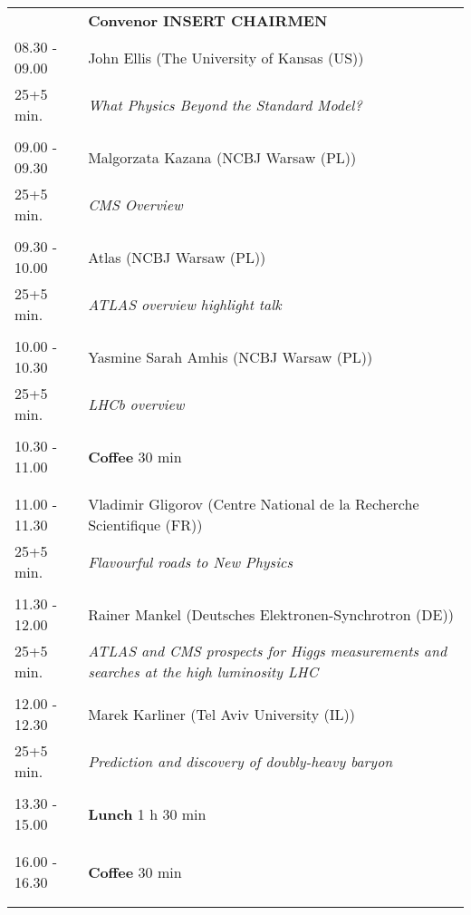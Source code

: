 \begin{longtable}{p{3cm}p{13cm}}
&\hfill {\bf Convenor INSERT CHAIRMEN }\\ 
08.30 - 09.00 & John Ellis (The University of Kansas (US))\\ 
25+5 min. & {\it What Physics Beyond the Standard Model?}\\ 
 & \\ 
09.00 - 09.30 & Malgorzata Kazana (NCBJ Warsaw (PL))\\ 
25+5 min. & {\it CMS Overview}\\ 
 & \\ 
09.30 - 10.00 & Atlas (NCBJ Warsaw (PL))\\ 
25+5 min. & {\it ATLAS overview highlight talk}\\ 
 & \\ 
10.00 - 10.30 & Yasmine Sarah Amhis (NCBJ Warsaw (PL))\\ 
25+5 min. & {\it LHCb overview}\\ 
 & \\ 
10.30 - 11.00 & {\bf Coffee} \hfill 30 min \\ 
 & \\ 
 & \\ 
11.00 - 11.30 & Vladimir Gligorov (Centre National de la Recherche Scientifique (FR))\\ 
25+5 min. & {\it Flavourful roads to New Physics}\\ 
 & \\ 
11.30 - 12.00 & Rainer Mankel (Deutsches Elektronen-Synchrotron (DE))\\ 
25+5 min. & {\it ATLAS and CMS prospects for Higgs measurements and searches at the high luminosity LHC}\\ 
 & \\ 
12.00 - 12.30 & Marek Karliner (Tel Aviv University (IL))\\ 
25+5 min. & {\it Prediction and discovery of doubly-heavy baryon}\\ 
 & \\ 
13.30 - 15.00 & {\bf Lunch} \hfill 1 h 30 min \\ 
 & \\ 
 & \\ 
16.00 - 16.30 & {\bf Coffee} \hfill 30 min \\ 
 & \\ 
 & \\ 
\end{longtable}

